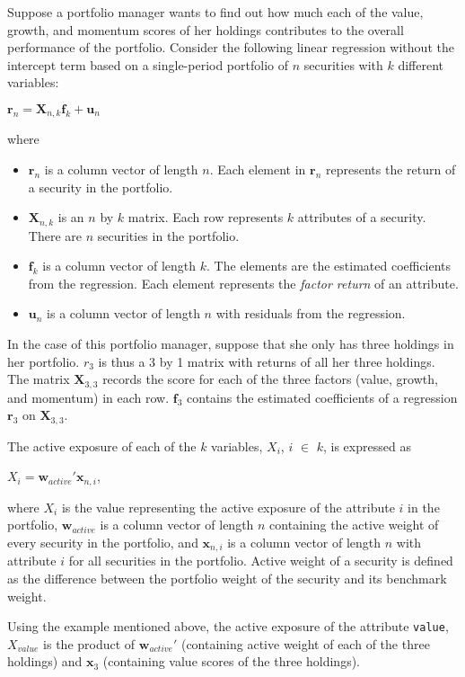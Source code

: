Suppose a portfolio manager wants to find out how much each of the
value, growth, and momentum scores of her holdings contributes to the
overall performance of the portfolio. Consider the following linear
regression without the intercept term based on a single-period
portfolio of $n$ securities with $k$ different variables:
\begin{center}
  $\mathbf{r}_n = \mathbf{X}_{n,k}\mathbf{f}_k + \mathbf{u}_n$
\end{center}
where 
\begin{itemize}
\item $\mathbf{r}_n$ is a column vector of length $n$. Each element in
  $\mathbf{r}_n$ represents the return of a security in the portfolio.
\item $\mathbf{X}_{n,k}$ is an $n$ by $k$ matrix. Each row represents
  $k$ attributes of a security. There are $n$ securities in the
  portfolio.
\item $\mathbf{f}_k$ is a column vector of length $k$. The elements
  are the estimated coefficients from the regression. Each element
  represents the \emph{factor return} of an attribute.
\item $\mathbf{u}_n$ is a column vector of length $n$ with residuals
  from the regression.
\end{itemize}

In the case of this portfolio manager, suppose that she only has three
holdings in her portfolio. $r_3$ is thus a 3 by 1 matrix with returns
of all her three holdings. The matrix $\mathbf{X}_{3,3}$ records the
score for each of the three factors (value, growth, and momentum) in
each row. $\mathbf{f}_3$ contains the estimated coefficients of a
regression $\mathbf{r}_3$ on $\mathbf{X}_{3, 3}$.

The active exposure of each of the $k$ variables, $X_{i}$, $i$
$\in$ $k$, is expressed as
\begin{center}
  $X_i = \mathbf{w}_{active}\prime \mathbf{x}_{n,i}$,
\end{center}
where $X_i$ is the value representing the active exposure of the
attribute $i$ in the portfolio, $\mathbf{w}_{active}$ is a column
vector of length $n$ containing the active weight of every security in
the portfolio, and $\mathbf{x}_{n, i}$ is a column vector of length
$n$ with attribute $i$ for all securities in the portfolio. Active
weight of a security is defined as the difference between the
portfolio weight of the security and its benchmark weight.

Using the example mentioned above, the active exposure of the
attribute \texttt{value}, $X_{value}$ is the product of
$\mathbf{w}_{active}\prime$ (containing active weight of each of the
three holdings) and $\mathbf{x}_{3}$ (containing value scores of the
three holdings).

